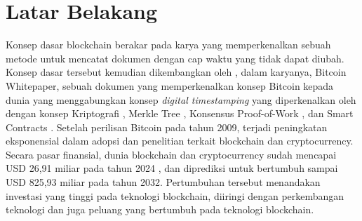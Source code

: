 \section{Latar Belakang}
\label{sec:latarbelakang}

Konsep dasar blockchain berakar pada karya \cite{haber1991time} yang memperkenalkan sebuah metode untuk mencatat dokumen dengan cap waktu yang tidak dapat diubah. Konsep dasar tersebut kemudian dikembangkan oleh \cite{nakamoto2008bitcoin}, dalam karyanya, Bitcoin Whitepaper, sebuah dokumen yang memperkenalkan konsep Bitcoin kepada dunia yang menggabungkan konsep \textit{digital timestamping} yang diperkenalkan oleh \cite{haber1991time} dengan konsep Kriptografi \parencite{hellman1976new} \parencite{standard1995secure}, Merkle Tree \parencite{merkle1987digital}, Konsensus Proof-of-Work \parencite{dwork1992pricing}, dan Smart Contracts \parencite{szabo1997formalizing}. Setelah perilisan Bitcoin pada tahun 2009, terjadi peningkatan eksponensial dalam adopsi dan penelitian terkait blockchain dan cryptocurrency. Secara pasar finansial, dunia blockchain dan cryptocurrency sudah mencapai USD 26,91 miliar pada tahun 2024 \parencite{rosencrance2024top}, dan diprediksi untuk bertumbuh sampai USD 825,93 miliar pada tahun 2032. Pertumbuhan tersebut menandakan investasi yang tinggi pada teknologi blockchain, diiringi dengan perkembangan teknologi dan juga peluang yang bertumbuh pada teknologi blockchain.


